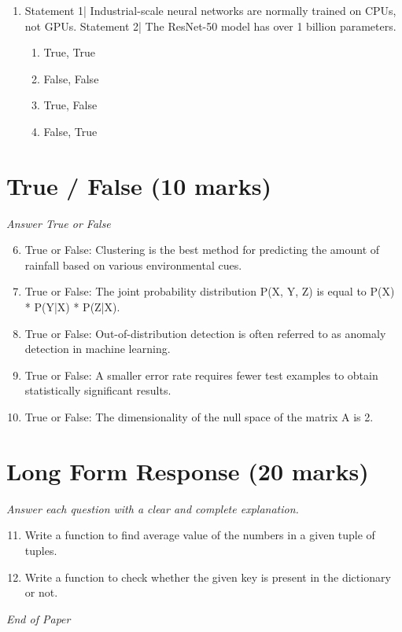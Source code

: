 \documentclass[12pt]{article}
\begin{document}
\begin{enumerate}[label=\arabic*.]
\begin{enumerate}[label=(\alph*)]
    \item It is used for prediction.
    \item It may be used for interpretation.
    \item It discovers causal relationships
\end{enumerate}
\item Statement 1| Industrial-scale neural networks are normally trained on CPUs, not GPUs. Statement 2| The ResNet-50 model has over 1 billion parameters.
\begin{enumerate}[label=(\alph*)]
    \item True, True
    \item False, False
    \item True, False
    \item False, True
\end{enumerate}
\end{enumerate}

\section*{True / False (10 marks)}
\textit{Answer True or False}
\begin{enumerate}[label=\arabic*.]
\setcounter{enumi}{5}
\item True or False: Clustering is the best method for predicting the amount of rainfall based on various environmental cues.
\item True or False: The joint probability distribution P(X, Y, Z) is equal to P(X) * P(Y|X) * P(Z|X).
\item True or False: Out-of-distribution detection is often referred to as anomaly detection in machine learning.
\item True or False: A smaller error rate requires fewer test examples to obtain statistically significant results.
\item True or False: The dimensionality of the null space of the matrix A is 2.
\end{enumerate}

\section*{Long Form Response (20 marks)}
\textit{Answer each question with a clear and complete explanation.}
\begin{enumerate}[label=\arabic*.]
\setcounter{enumi}{10}
\item Write a function to find average value of the numbers in a given tuple of tuples.
\item Write a function to check whether the given key is present in the dictionary or not.
\end{enumerate}

\vfill
\noindent\textit{End of Paper}
\end{document}
